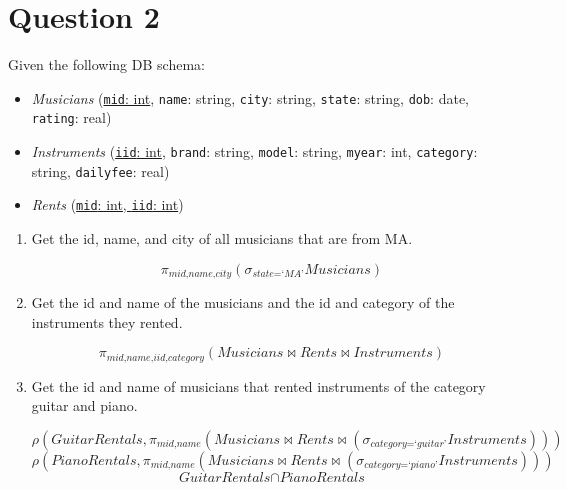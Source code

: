 \documentclass[letterpaper, 11pt]{article}
\begin{document}
\section*{Question 2}

Given the following DB schema:
\begin{itemize}
    \item \textit{Musicians} (\ul{\texttt{mid}: int}, \texttt{name}: string, \texttt{city}: string, \texttt{state}: string, \texttt{dob}: date, \texttt{rating}: real)
    \item \textit{Instruments} (\ul{\texttt{iid}: int}, \texttt{brand}: string, \texttt{model}: string, \texttt{myear}: int, \texttt{category}: string, \texttt{dailyfee}: real)
    \item \textit{Rents} (\ul{\texttt{mid}: int, \texttt{iid}: int})
\end{itemize}

\begin{enumerate}[label={\alph*}.,leftmargin=*]
    \item Get the id, name, and city of all musicians that are from MA.
    
    \begin{tcolorbox}
    \[\pi_{\textit{mid,name,city}}\left(\sigma_{\textit{state}=\textit{`MA'}}\textit{Musicians}\right)\]
    \end{tcolorbox}
    
    \item Get the id and name of the musicians and the id and category of the instruments they rented.

    \begin{tcolorbox}
    \[\pi_{\textit{mid,name,iid,category}}\left(\textit{Musicians} \bowtie \textit{Rents} \bowtie \textit{Instruments}\right)\]
    \end{tcolorbox}

    \item Get the id and name of musicians that rented instruments of the category guitar and piano.
    \begin{tcolorbox}
    \[\rho\left(\textit{GuitarRentals}, \pi_{\textit{mid,name}}\left(\textit{Musicians} \bowtie \textit{Rents} \bowtie \left(\sigma_{\textit{category}=\textit{`guitar'}}\textit{Instruments}\right)\right)\right)\]
    \[\rho\left(\textit{PianoRentals}, \pi_{\textit{mid,name}}\left(\textit{Musicians} \bowtie \textit{Rents} \bowtie \left(\sigma_{\textit{category}=\textit{`piano'}}\textit{Instruments}\right)\right)\right)\]
    \[\textit{GuitarRentals} \cap \textit{PianoRentals}\]
    \end{tcolorbox}
\end{enumerate}
\end{document}
